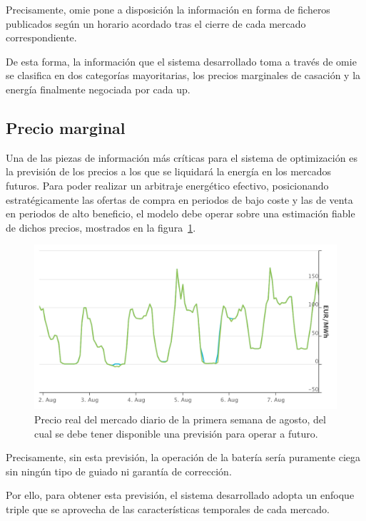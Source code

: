Precisamente, \gls{omie} pone a disposición la información en forma de ficheros publicados según un horario acordado tras el cierre de cada mercado correspondiente.

De esta forma, la información que el sistema desarrollado toma a través de \gls{omie} se clasifica en dos categorías mayoritarias, los precios marginales de casación y la energía finalmente negociada por cada \gls{up}.

\subsection{Precio marginal}
\label{makereference4.1.1}

Una de las piezas de información más críticas para el sistema de optimización es la previsión de los precios a los que se liquidará la energía en los mercados futuros. Para poder realizar un arbitraje energético efectivo, posicionando estratégicamente las ofertas de compra en periodos de bajo coste y las de venta en periodos de alto beneficio, el modelo debe operar sobre una estimación fiable de dichos precios, mostrados en la figura~\ref{fig:mercado-diario}.

\begin{figure}
  \centering
  \includegraphics[width=0.75\linewidth]{figures/mercado-diario.png}
  \caption[Precio del mercado diario de la primera semana de agosto.]{Precio real del mercado diario de la primera semana de agosto, del cual se debe tener disponible una previsión para operar a futuro.}
  \label{fig:mercado-diario}
\end{figure}

Precisamente, sin esta previsión, la operación de la batería sería puramente ciega sin ningún tipo de guiado ni garantía de corrección.

Por ello, para obtener esta previsión, el sistema desarrollado adopta un enfoque triple que se aprovecha de las características temporales de cada mercado.

